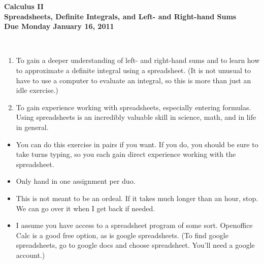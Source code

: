 \documentclass[12pt]{article}
\begin{document}
\pagestyle{empty}
 
\begin{center}
{\large {\bf Calculus II}}\\
\medskip
{\large {\bf Spreadsheets, Definite Integrals, and Left- and
    Right-hand Sums}}\\ 
\medskip
{ {\bf Due Monday January 16, 2011}}\\ 
\end{center}

\hspace{2mm}\\

\begin{enumerate}
  \item To gain a deeper understanding of left- and right-hand sums
    and to learn how to approximate a definite integral using a
    spreadsheet.  (It is not unusual to have to use a computer to
    evaluate an integral, so this is more than just an idle exercise.)
  \item To gain experience working with spreadsheets, especially
    entering formulas.  Using spreadsheets is an incredibly valuable
    skill in science, math, and in life in general.\\
\end{enumerate}



\begin{itemize}
\setlength{\itemsep}{-1mm}
  \item You can do this exercise in pairs if you want.  If you do, you
    should be sure to take turns typing, so you each gain direct
    experience working with the spreadsheet.  
  \item Only hand in one assignment per duo.
  \item This is not meant to be an ordeal.  If it takes much longer
    than an hour, stop.  We can go over it when I get back if needed. 
  \item I assume you have access to a spreadsheet program of some
    sort.  Openoffice Calc is a good free option, as is google
    spreadsheets.  (To find google spreadsheets, go to google docs and
    choose spreadsheet.  You'll need a google account.)\\
\end{itemize}
\end{document}
